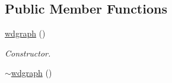 \subsection*{Public Member Functions}
\begin{DoxyCompactItemize}
\item 
\hyperlink{classlgraph_1_1utils_1_1wdgraph_a5b2ab9227ed3ea23596eebb4b4f397cb}{wdgraph} ()\hypertarget{classlgraph_1_1utils_1_1wdgraph_a5b2ab9227ed3ea23596eebb4b4f397cb}{}\label{classlgraph_1_1utils_1_1wdgraph_a5b2ab9227ed3ea23596eebb4b4f397cb}

\begin{DoxyCompactList}\small\item\em Constructor. \end{DoxyCompactList}\item 
\hyperlink{classlgraph_1_1utils_1_1wdgraph_ad5d7319df97007af7f2d6d3bc994c679}{$\sim$wdgraph} ()\hypertarget{classlgraph_1_1utils_1_1wdgraph_ad5d7319df97007af7f2d6d3bc994c679}{}\label{classlgraph_1_1utils_1_1wdgraph_ad5d7319df97007af7f2d6d3bc994c679}


\end{DoxyCompactItemize}
